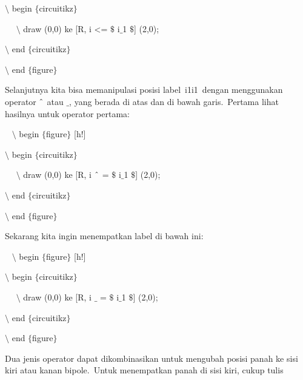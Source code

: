 \noindent 
 $\setminus$ begin $ \{ $circuitikz$ \} $
\par


\noindent 
~~ $\setminus$ draw (0,0) ke [R, i <= $\$$ i$ \_ $1 $\$$] (2,0);
\par


\noindent 
 $\setminus$ end $ \{ $circuitikz$ \} $
\par


\noindent 
 $\setminus$ end $ \{ $figure$ \} $ 
\par


\noindent 
Selanjutnya kita bisa memanipulasi posisi label i1i1 dengan menggunakan operator $ \string^ $ atau $ \_ $, yang berada di atas dan di bawah garis. Pertama lihat hasilnya untuk operator pertama:
\par


\noindent 
~ $\setminus$ begin $ \{ $figure$ \} $ [h!]
\par


\noindent 
 $\setminus$ begin $ \{ $circuitikz$ \} $
\par


\noindent 
~~ $\setminus$ draw (0,0) ke [R, i $ \string^ $ = $\$$ i$ \_ $1 $\$$] (2,0);
\par


\noindent 
 $\setminus$ end $ \{ $circuitikz$ \} $
\par


\noindent 
 $\setminus$ end $ \{ $figure$ \} $
\par


\noindent 
Sekarang kita ingin menempatkan label di bawah ini:
\par


\noindent 
~ $\setminus$ begin $ \{ $figure$ \} $ [h!]
\par


\noindent 
 $\setminus$ begin $ \{ $circuitikz$ \} $
\par


\noindent 
~~ $\setminus$ draw (0,0) ke [R, i $ \_ $ = $\$$ i$ \_ $1 $\$$] (2,0);
\par


\noindent 
 $\setminus$ end $ \{ $circuitikz$ \} $
\par


\noindent 
 $\setminus$ end $ \{ $figure$ \} $ 
\par


\noindent 
Dua jenis operator dapat dikombinasikan untuk mengubah posisi panah ke sisi kiri atau kanan bipole. Untuk menempatkan panah di sisi kiri, cukup tulis
\par


